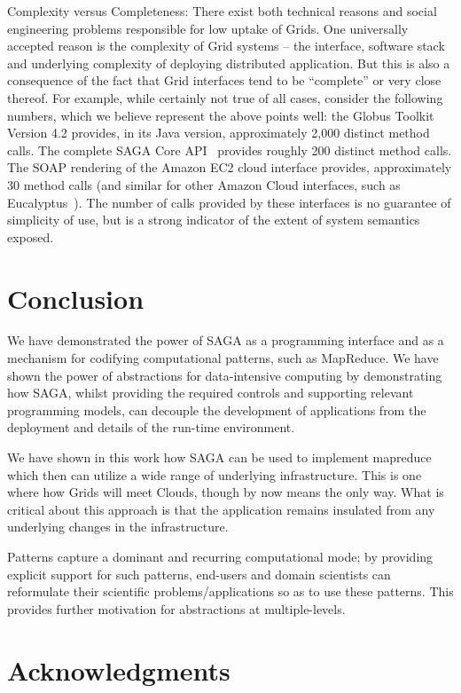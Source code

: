 \documentclass[conference,final]{IEEEtran}
\begin{document}
Complexity versus Completeness: There exist both technical reasons and
social engineering problems responsible for low uptake of Grids. One
universally accepted reason is the complexity of Grid systems -- the
interface, software stack and underlying complexity of deploying
distributed application. But this is also a consequence of the fact
that Grid interfaces tend to be ``complete'' or very close thereof.
For example, while certainly not true of all cases, consider the
following numbers, which we believe represent the above points well:
the Globus Toolkit Version 4.2 provides, in its Java version,
approximately 2,000 distinct method calls.  The complete SAGA Core
API~\cite{saga_gfd90} provides roughly 200 distinct method calls.  The
SOAP rendering of the Amazon EC2 cloud interface provides,
approximately 30 method calls (and similar for other Amazon Cloud
interfaces, such as Eucalyptus~\cite{eucalyptus_url}).  The number of
calls provided by these interfaces is no guarantee of simplicity of
use, but is a strong indicator of the extent of system semantics
exposed.

\section{Conclusion}

We have demonstrated the power of SAGA as a programming interface and
as a mechanism for codifying computational patterns, such as
MapReduce.  We have shown the power of abstractions for data-intensive
computing by demonstrating how SAGA, whilst providing the required
controls and supporting relevant programming models, can decouple the
development of applications from the deployment and details of the
run-time environment.

We have shown in this work how SAGA can be used to implement mapreduce
which then can utilize a wide range of underlying infrastructure. This
is one where how Grids will meet Clouds, though by now means the only
way. What is critical about this approach is that the application
remains insulated from any underlying changes in the infrastructure.

Patterns capture a dominant and recurring computational mode; by
providing explicit support for such patterns, end-users and domain
scientists can reformulate their scientific problems/applications so
as to use these patterns.  This provides further motivation for
abstractions at multiple-levels.

\section{Acknowledgments}
\end{document}
